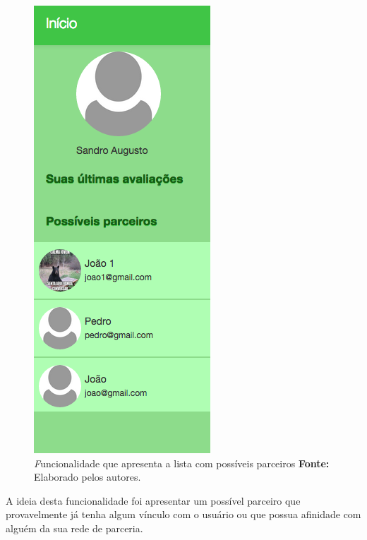\begin{figure}[h!]
	\centerline{\includegraphics[scale=0.4]{./imagens/busca-possiveis-parceiros.png}}
	\caption[\textit Funcionalidade que apresenta a lista com possíveis parceiros]
	{\textit Funcionalidade que apresenta a lista com possíveis parceiros \textbf{Fonte:} Elaborado pelos autores.}
	\label{fig:busca_possiveis_parceiros}
\end{figure}

\par A ideia desta funcionalidade foi apresentar um possível parceiro que provavelmente já tenha algum vínculo com o usuário ou que possua afinidade com alguém da sua rede de parceria.